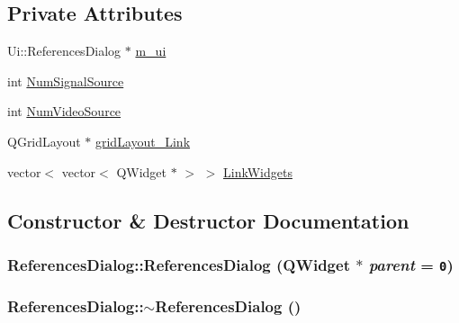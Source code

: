 \subsection*{Private Attributes}
\begin{CompactItemize}
\item 
Ui::ReferencesDialog $\ast$ \hyperlink{class_references_dialog_cc63187266913a0639e2dbe11782c772}{m\_\-ui}
\item 
int \hyperlink{class_references_dialog_cd8062e49e77e41d80d81a074a3a9934}{NumSignalSource}
\item 
int \hyperlink{class_references_dialog_4d3fd938d7e33ec8adc8659294906a81}{NumVideoSource}
\item 
QGridLayout $\ast$ \hyperlink{class_references_dialog_8bbbdea6e4f6324c6ebc244a7388d5b4}{gridLayout\_\-Link}
\item 
vector$<$ vector$<$ QWidget $\ast$ $>$ $>$ \hyperlink{class_references_dialog_aa96dd6f334be4110a22c347af4a3f32}{LinkWidgets}
\end{CompactItemize}


\subsection{Constructor \& Destructor Documentation}
\hypertarget{class_references_dialog_1f3990e5a3cd494c4094c77378059ddd}{
\subsubsection[{ReferencesDialog}]{\setlength{\rightskip}{0pt plus 5cm}ReferencesDialog::ReferencesDialog (QWidget $\ast$ {\em parent} = {\tt 0})}}
\label{class_references_dialog_1f3990e5a3cd494c4094c77378059ddd}


\hypertarget{class_references_dialog_ad24575b5bd4faab98827b988a562811}{
\subsubsection[{$\sim$ReferencesDialog}]{\setlength{\rightskip}{0pt plus 5cm}ReferencesDialog::$\sim$ReferencesDialog ()}}
\label{class_references_dialog_ad24575b5bd4faab98827b988a562811}




